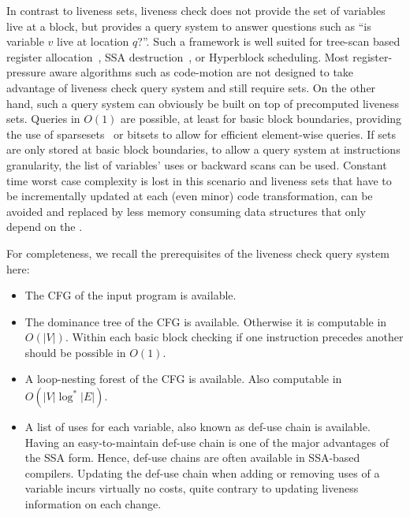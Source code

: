 In contrast to liveness sets, liveness check does not provide the set of variables live at a block, but provides a query system to answer questions such as ``is variable $v$ live at location $q$?''.
Such a framework is well suited for tree-scan based register allocation~\cite{ColombetBBHR11}, SSA destruction~\cite{boissinot:2009:ssadestruction}, or Hyperblock scheduling.
Most register-pressure aware algorithms such as code-motion are not designed to take advantage of liveness check query system and still require sets.
On the other hand, such a query system can obviously be built on top of precomputed liveness sets.
Queries in $O(1)$ are possible, at least for basic block boundaries, providing the use of sparsesets~\cite{cooper:2004:engineering} or bitsets to allow for efficient element-wise queries.
If sets are only stored at basic block boundaries, to allow a query system at instructions granularity, the list of variables' uses or backward scans can be used.
Constant time worst case complexity is lost in this scenario and liveness sets that have to be incrementally updated at each (even minor) code transformation, can be avoided and replaced by less memory consuming data structures that only depend on the \@CFG.

For completeness, we recall the prerequisites of the liveness check query system here:
\begin{itemize}
\item
	The CFG of the input program is available.
\item
	The dominance tree of the CFG is available.
	Otherwise it is computable in $O(|V|)$.
	Within each basic block checking if one instruction precedes another should be possible in $O(1)$.
\item
	A loop-nesting forest of the CFG is available.
	Also computable in~$O(|V| \log^*|E|)$.
\item
	A list of uses for each variable, also known as def-use chain is available.
	Having an easy-to-maintain def-use chain is one of the major advantages of the SSA form.
	Hence, def-use chains are often available in SSA-based compilers.
	Updating the def-use chain when adding or removing uses of a variable incurs virtually no costs, quite contrary to updating liveness information on each change.
\end{itemize}

